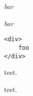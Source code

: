 
\def\mytitle{HTML Inline}


\emph{bar}

\emph{bar}

\begin{verbatim}
<div>
    foo
</div>
\end{verbatim}

test.

test.




